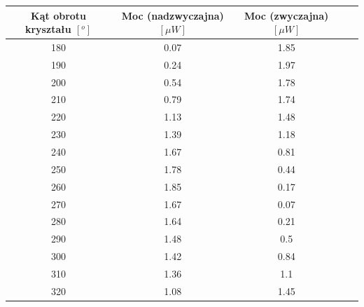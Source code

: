 \documentclass[quantumrep,article,accept,oneauthor,pdftex]{Definitions/mdpi}
\begin{document}
\begin{table}[H]
\centering
\begin{tabular}{ccccc}
\toprule
\textbf{Kąt obrotu kryształu \( [^o] \)} & \textbf{Moc (nadzwyczajna) \( [\mu W] \)} & \textbf{Moc (zwyczajna) \( [\mu W] \)} \\
\midrule
180                                   & 0.07                                 & 1.85                              \\
190                                   & 0.24                                 & 1.97                              \\
200                                   & 0.54                                 & 1.78                              \\
210                                   & 0.79                                 & 1.74                              \\
220                                   & 1.13                                 & 1.48                              \\
230                                   & 1.39                                 & 1.18                              \\
240                                   & 1.67                                 & 0.81                              \\
250                                   & 1.78                                 & 0.44                              \\
260                                   & 1.85                                 & 0.17                              \\
270                                   & 1.67                                 & 0.07                              \\
280                                   & 1.64                                 & 0.21                              \\
290                                   & 1.48                                 & 0.5                               \\
300                                   & 1.42                                 & 0.84                              \\
310                                   & 1.36                                 & 1.1                               \\
320                                   & 1.08                                 & 1.45                              \\

\end{tabular}
\end{table}
\end{document}
